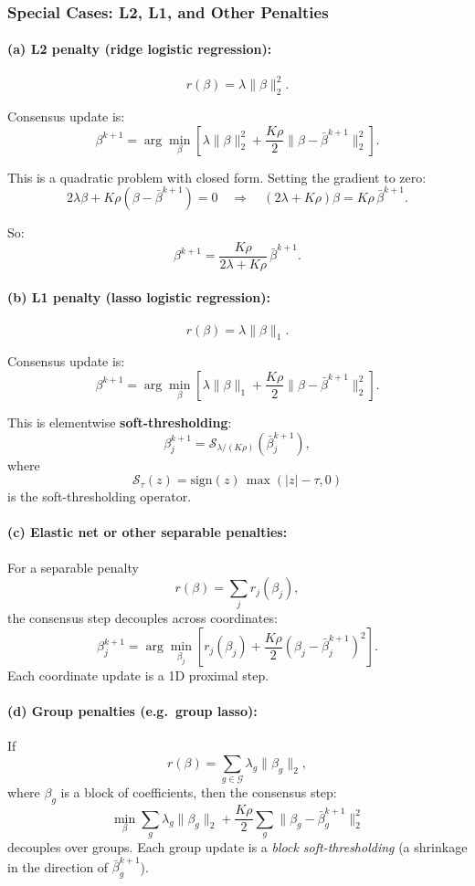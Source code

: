 \documentclass[11pt]{article}
\begin{document}
\subsubsection*{Special Cases: L2, L1, and Other Penalties}

\paragraph{(a) L2 penalty (ridge logistic regression):}
\[
    r(\beta) = \lambda \|\beta\|_2^2.
\]

Consensus update is:
\[
    \beta^{k+1} = \arg\min_\beta
    \left[
      \lambda \|\beta\|_2^2 + \frac{K\rho}{2} \|\beta - \bar{\beta}^{k+1}\|_2^2
    \right].
\]

This is a quadratic problem with closed form. Setting the gradient to zero:
\[
    2\lambda \beta + K\rho (\beta - \bar{\beta}^{k+1}) = 0
    \quad \Rightarrow \quad
    (2\lambda + K\rho)\beta = K\rho \,\bar{\beta}^{k+1}.
\]

So:
\[
    \beta^{k+1}
    = \frac{K\rho}{2\lambda + K\rho} \,\bar{\beta}^{k+1}.
\]

\paragraph{(b) L1 penalty (lasso logistic regression):}
\[
    r(\beta) = \lambda \|\beta\|_1.
\]

Consensus update is:
\[
    \beta^{k+1}
    = \arg\min_\beta
    \left[
        \lambda \|\beta\|_1 + \frac{K\rho}{2} \|\beta - \bar{\beta}^{k+1}\|_2^2
    \right].
\]

This is elementwise \textbf{soft-thresholding}:
\[
    \beta_j^{k+1}
    = \mathcal{S}_{\lambda/(K\rho)}\left(\bar{\beta}^{k+1}_j\right),
\]
where
\[
    \mathcal{S}_\tau(z) = \text{sign}(z)\,\max(|z| - \tau, 0)
\]
is the soft-thresholding operator.

\paragraph{(c) Elastic net or other separable penalties:}

For a separable penalty
\[
    r(\beta) = \sum_{j} r_j(\beta_j),
\]
the consensus step decouples across coordinates:
\[
    \beta_j^{k+1}
    = \arg\min_{\beta_j}
    \left[
        r_j(\beta_j) + \frac{K\rho}{2} (\beta_j - \bar{\beta}^{k+1}_j)^2
    \right].
\]
Each coordinate update is a 1D proximal step.

\paragraph{(d) Group penalties (e.g.\ group lasso):}
If
\[
    r(\beta) = \sum_{g \in \mathcal{G}} \lambda_g \|\beta_g\|_2,
\]
where $\beta_g$ is a block of coefficients, then the consensus step:
\[
    \min_\beta \sum_{g} \lambda_g \|\beta_g\|_2 + \frac{K\rho}{2} \sum_g \|\beta_g - \bar{\beta}_g^{k+1}\|_2^2
\]
decouples over groups. Each group update is a \emph{block soft-thresholding} (a shrinkage in the direction of $\bar{\beta}_g^{k+1}$).
\end{document}

